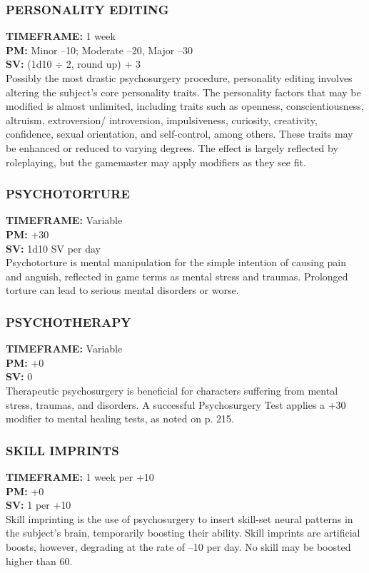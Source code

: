 \subsubsection{PERSONALITY EDITING}
\textbf{TIMEFRAME:} 1 week \\
\textbf{PM:} Minor –10; Moderate –20, Major –30 \\
\textbf{SV:} (1d10 $\div$ 2, round up) + 3 \\
Possibly the most drastic psychosurgery procedure,
personality editing involves altering the subject’s core
personality traits. The personality factors that may be
modified is almost unlimited, including traits such as
openness, conscientiousness, altruism, extroversion/
introversion, impulsiveness, curiosity, creativity, confidence, sexual orientation, and self-control, among
others. These traits may be enhanced or reduced to
varying degrees. The effect is largely reflected by roleplaying,
but the gamemaster may apply modifiers as
they see fit.

\subsubsection{PSYCHOTORTURE}
\textbf{TIMEFRAME:} Variable \\
\textbf{PM:} +30 \\
\textbf{SV:} 1d10 SV per day \\
Psychotorture is mental manipulation for the simple
intention of causing pain and anguish, reflected in
game terms as mental stress and traumas. Prolonged
torture can lead to serious mental disorders or worse.

\subsubsection{PSYCHOTHERAPY}
\textbf{TIMEFRAME:} Variable \\
\textbf{PM:} +0 \\
\textbf{SV:} 0 \\
Therapeutic psychosurgery is beneficial for characters
suffering from mental stress, traumas, and disorders. A
successful Psychosurgery Test applies a +30 modifier
to mental healing tests, as noted on p. 215.

\subsubsection{SKILL IMPRINTS}
\textbf{TIMEFRAME:} 1 week per +10 \\
\textbf{PM:} +0 \\
\textbf{SV:} 1 per +10 \\
Skill imprinting is the use of psychosurgery to insert
skill-set neural patterns in the subject’s brain, temporarily
boosting their ability. Skill imprints are artificial
boosts, however, degrading at the rate of –10 per day.
No skill may be boosted higher than 60.

